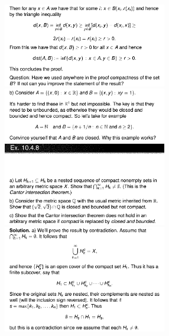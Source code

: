 \documentclass[8pt,landscape]{article}
\begin{document}
\begin{multicols}{3}
    \includegraphics[width=270]{Slides15.png} \\
    \includegraphics[width=270]{Slides16.png} \\
    \includegraphics[width=270]{Slides17.png} \\
    \includegraphics[width=270]{Slides18.png} \\

\end{multicols}
\end{document}
